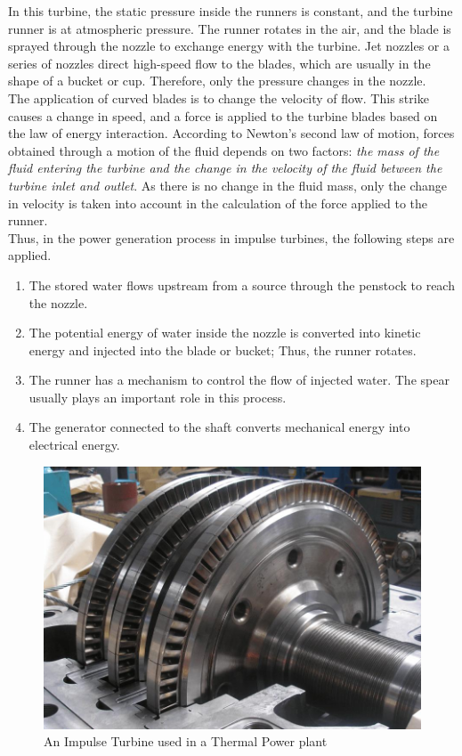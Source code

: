 \documentclass[11pt]{article}
\begin{document}
In this turbine, the static pressure inside the runners is constant, and the turbine runner is at atmospheric pressure. The runner rotates in the air, and the blade is sprayed through the nozzle to exchange energy with the turbine. Jet nozzles or a series of nozzles direct high-speed flow to the blades, which are usually in the shape of a bucket or cup. Therefore, only the pressure changes in the nozzle.\\ 

The application of curved blades is to change the velocity of flow. This strike causes a change in speed, and a force is applied to the turbine blades based on the law of energy interaction. According to Newton’s second law of motion, forces obtained through a motion of the fluid depends on two factors: \textit{the mass of the fluid entering the turbine and the change in the velocity of the fluid between the turbine inlet and outlet}. As there is no change in the fluid mass, only the change in velocity is taken into account in the calculation of the force applied to the runner.\\

Thus, in the power generation process in impulse turbines, the following steps are applied.
 
\begin{enumerate}
	\item The stored water flows upstream from a source through the penstock to reach the nozzle.
	\item The potential energy of water inside the nozzle is converted into kinetic energy and injected into the blade or bucket; Thus, the runner rotates.
	\item The runner has a mechanism to control the flow of injected water. The spear usually plays an important role in this process.
	\item The generator connected to the shaft converts mechanical energy into electrical energy.
\end{enumerate}


\begin{figure}[H]
	\centering
	\includegraphics[scale=0.4]{impulse turbine thermal.jpg}
	\caption{An Impulse Turbine used in a Thermal Power plant}
	\label{it}
\end{figure}
\end{document}
